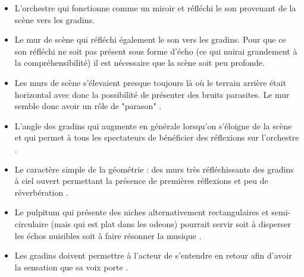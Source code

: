 \begin{itemize}
\item L'orchestre qui fonctionne comme un miroir et réfléchi le son provenant de la scène vers les gradins.
\item Le mur de scène qui réfléchi également le son vers les gradins. Pour que ce son réfléchi ne soit pas présent sous forme d'écho (ce qui nuirai grandement à la compréhensibilité) il est nécessaire que la scène soit peu profonde.
\item Les murs de scène s'élevaient presque toujours là où le terrain arrière était horizontal avec donc la possibilité de présenter des bruits parasites. Le mur semble donc avoir un rôle de "parason" \cite[p.38]{canac}.
\item L'angle des gradins qui augmente en générale lorsqu'on s'éloigne de la scène et qui permet à tous les spectateurs de bénéficier des réflexions sur l'orchestre \cite[p.103-109]{canac}.
\item Le caractère simple de la géométrie : des murs très réfléchissants des gradins à ciel ouvert permettant la présence de premières réflexions et peu de réverbération \cite[p.33]{canac}.
\item Le \gls{pulpitum} qui présente des niches alternativement rectangulaires et semi-circulaire (mais qui est plat dans les \glspl{odeon}) pourrait servir soit à disperser les échos nuisibles soit à faire résonner la musique \cite[p.38]{canac}.
\item Les gradins doivent permettre à l'acteur de s'entendre en retour afin d'avoir la sensation que sa voix porte \cite[p.42 - tab.II-4]{canac}.
\end{itemize}
